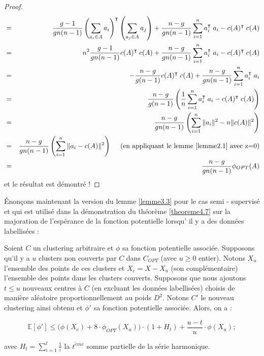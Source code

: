 \documentclass[12pt,a4paper]{book}
\newcommand{\E}{\mathbb{E}}
\newcommand{\1}{\mathds{1}}
\begin{document}
\begin{proof}
\begin{eqnarray*}
			&=& \frac{g-1}{gn(n-1)} \left( \sum_{a_i \in A} a_i \right)^\intercal \left( \sum_{a_j \in A} a_j \right) + \frac{n-g}{gn(n-1)} \sum_{i=1}^n a_i^\intercal \; a_i - c(A)^\intercal \; c(A) \\
			&=& n^2 \frac{g-1}{gn(n-1)} c(A)^\intercal \; c(A) + \frac{n-g}{gn(n-1)} \sum_{i=1}^n a_i^\intercal \; a_i - c(A)^\intercal \; c(A) \\
			&=& - \frac{n-g}{g(n-1)} c(A)^\intercal \; c(A) + \frac{n-g}{gn(n-1)} \sum_{i=1}^n a_i^\intercal \; a_i \\
			&=& \frac{n-g}{g(n-1)} \left( \frac{1}{n} \sum_{i=1}^n a_i^\intercal \; a_i - c(A)^\intercal \; c(A) \right)\\
			&=& \frac{n-g}{gn(n-1)} \left( \sum_{i=1}^n \Vert a_i \Vert^2 - n \Vert c(A) \Vert^2 \right) \\
			&=& \frac{n-g}{gn(n-1)} \left( \sum_{i=1}^n \Vert a_i - c(A) \Vert^2 \right) \quad \textrm{ (en appliquant le lemme \ref{lemme2.1} avec z=0)}\\
			&=& \frac{n-g}{gn(n-1)} \phi_{OPT}(A)
		\end{eqnarray*}
		et le résultat est démontré !
		
	\end{proof}	
	
	
	Énonçons maintenant la version du lemme \ref{lemme3.3} pour le cas semi - supervisé et qui est utilisé dans la démonstration du théorème \ref{theoreme4.7} sur la majoration de l'espérance de la fonction potentielle lorsqu' il y a des données labellisées :
	
	\begin{env_lemme}\label{lemme4.6}
		Soient $C$ un clustering arbitraire  et $\phi$ sa fonction potentielle associée.
		Supposons qu'il y a $u$ clusters  non couverts par $C$ dans $C_{OPT}$ (avec $u \geq 0$ entier). Notons $X_u$ l'ensemble des points de ces clusters et $X_c=X-X_u$ (son complémentaire) l'ensemble des points dans les clusters couverts. Supposons que nous ajoutons $t \leq u$ nouveaux centres à $C$ (en excluant les données labellisées) choisis de manière aléatoire proportionnellement au poids $D^2$. Notons $C'$ le nouveau clustering ainsi obtenu et $\phi'$ sa fonction potentielle associée. Alors, on a :
		
		$$
			\E\left[\phi'\right] \leq \bigg( \phi \left( X_c \right) + 8 \cdot \phi_{OPT} \left( X_u \right) \bigg) \cdot \left( 1 + H_t \right) + \frac{u-t}{u} \cdot \phi \left( X_u \right) ;
		$$
		
		avec $H_t = \displaystyle \sum_{i=1}^{t} \frac{1}{i}$ la $t^{\grave{e}me}$ somme partielle de la série harmonique.
	\end{env_lemme}	
	
\end{document}
